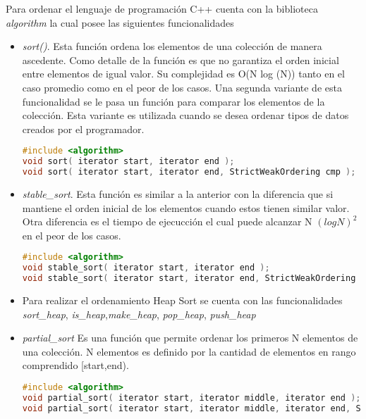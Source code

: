 Para ordenar el lenguaje de programación C++ cuenta con la biblioteca {\em algorithm} la cual posee las siguientes funcionalidades

\begin{itemize}
	\item {\em sort()}. Esta función ordena los elementos de una colección de manera ascedente. Como detalle de la función es que no garantiza el orden inicial entre elementos de igual valor. Su complejidad es O(N log (N))  tanto en el caso promedio como en el peor de los casos. Una segunda variante de esta funcionalidad se le pasa un función para comparar los elementos de la colección. Esta variante es utilizada cuando se desea ordenar tipos de datos creados por el programador.
\begin{lstlisting}[language=C++]
#include <algorithm>
void sort( iterator start, iterator end );
void sort( iterator start, iterator end, StrictWeakOrdering cmp );
\end{lstlisting} 

\item {\em stable\_sort}. Esta función es similar a la anterior con la diferencia que si mantiene el orden inicial de los elementos cuando estos tienen similar valor. Otra diferencia es el tiempo de ejecucción el cual puede alcanzar N $(log N)^{2}$ en el peor de los casos.
\begin{lstlisting}[language=C++]
#include <algorithm>
void stable_sort( iterator start, iterator end );
void stable_sort( iterator start, iterator end, StrictWeakOrdering cmp );
\end{lstlisting} 

\item Para realizar el ordenamiento Heap Sort se cuenta con las funcionalidades {\em sort\_heap}, {\em is\_heap},{\em make\_heap}, {\em pop\_heap}, {\em push\_heap}

\item {\em partial\_sort} Es una función que permite ordenar los primeros N elementos de una colección. N elementos es definido por la cantidad de elementos en rango comprendido [start,end).  

\begin{lstlisting}[language=C++]
#include <algorithm>
void partial_sort( iterator start, iterator middle, iterator end );
void partial_sort( iterator start, iterator middle, iterator end, StrictWeakOrdering cmp );
\end{lstlisting}

\end{itemize}